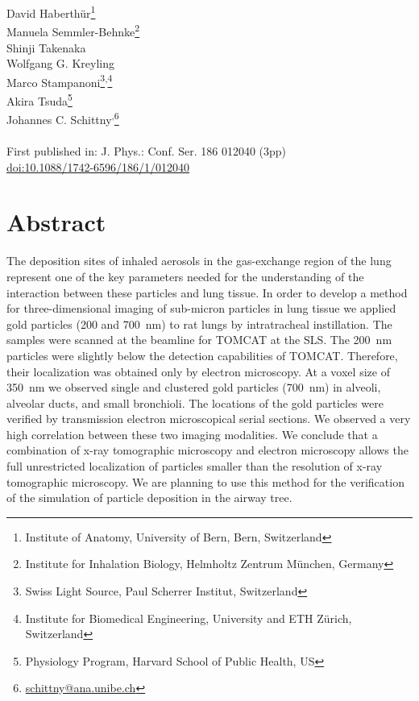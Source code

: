 \label{ch:XRM2008}

\newcommand{\footremember}[2]{\footnote{#2}\newcounter{#1}\setcounter{#1}{\value{footnote}}}%
\newcommand{\footrecall}[1]{\footnotemark[\value{#1}]} 

David Haberthür\footremember{ana}{Institute of Anatomy, University of Bern, Bern, Switzerland}\\
Manuela Semmler-Behnke\footremember{inhalation}{Institute for Inhalation Biology, Helmholtz Zentrum München, Germany}\\
Shinji Takenaka\footrecall{inhalation}\\
Wolfgang G. Kreyling\footrecall{inhalation}\\
Marco Stampanoni\footremember{psi}{Swiss Light Source, Paul Scherrer Institut, Switzerland}\textsuperscript{,}\footremember{eth}{Institute for Biomedical Engineering, University and ETH Zürich, Switzerland}\\
Akira Tsuda\footnote{Physiology Program, Harvard School of Public Health, US}\\
Johannes C. Schittny\footrecall{ana}\textsuperscript{,}\footnote{\href{mailto:schittny@ana.unibe.ch}{schittny@ana.unibe.ch}}\\\\
First published in: J. Phys.: Conf. Ser. 186 012040 (3pp)\\
\href{http://dx.doi.org/10.1088/1742-6596/186/1/012040}{doi:10.1088/1742-6596/186/1/012040}

\section{Abstract}
The deposition sites of inhaled aerosols in the gas-exchange region of the lung represent one of the key parameters needed for the understanding of the interaction between these particles and lung tissue. In order to develop a method for three-dimensional imaging of sub-micron particles in lung tissue we applied gold particles (200 and \SI{700}{\nano\meter}) to rat lungs by intratracheal instillation. The samples were scanned at the beamline for \acf{TOMCAT} at the \acl{SLS}. The \SI{200}{\nano\meter} particles were slightly below the detection capabilities of \acs{TOMCAT}. Therefore, their localization was obtained only by electron microscopy. At a voxel size of \SI{350}{\nano\meter} we observed single and clustered gold particles (\SI{700}{\nano\meter}) in alveoli, alveolar ducts, and small bronchioli. The locations of the gold particles were verified by transmission electron microscopical serial sections. We observed a very high correlation between these two imaging modalities. We conclude that a combination of x-ray tomographic microscopy and electron microscopy allows the full unrestricted \threed localization of particles smaller than the resolution of x-ray tomographic microscopy. We are planning to use this method for the verification of the simulation of particle deposition in the airway tree.


